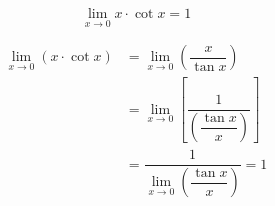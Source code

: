 \documentclass[14pt,fleqn]{extarticle}
\begin{document}
 

\begin{snippet}
    \correct
\[ \lim_{x\to 0}x\cdot\cot x = 1 \]    
    
    \reason

\begin{align}
\lim_{x\to 0}\left( x\cdot \cot x\right) &= \lim_{x\to 0}\left(\dfrac{x}{\tan x}\right) \\
&= \lim_{x\to 0}\left[ \dfrac{1}{\left(\dfrac{\tan x}{x}\right)}\right] \\
&= \dfrac{1}{\lim_{x\to 0}\left(\dfrac{\tan x}{x}\right)} = 1
\end{align}
    
\end{snippet} 
\end{document}
